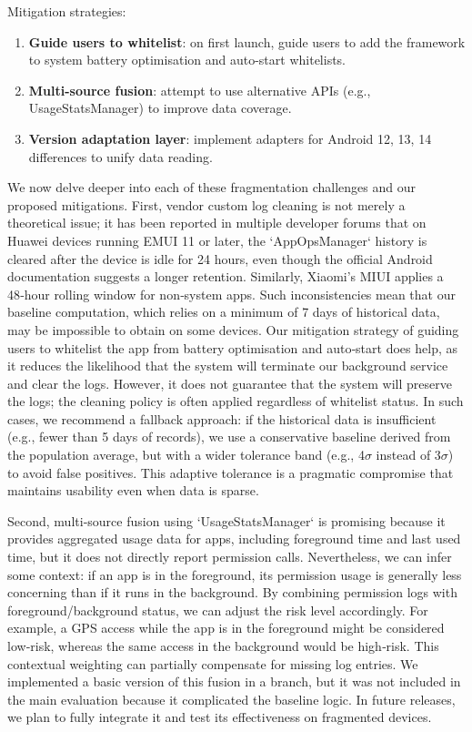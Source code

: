 Mitigation strategies:
\begin{enumerate}
\item \textbf{Guide users to whitelist}: on first launch, guide users to add the framework to system battery optimisation and auto-start whitelists.
\item \textbf{Multi-source fusion}: attempt to use alternative APIs (e.g., UsageStatsManager) to improve data coverage.
\item \textbf{Version adaptation layer}: implement adapters for Android 12, 13, 14 differences to unify data reading.
\end{enumerate}

We now delve deeper into each of these fragmentation challenges and our proposed mitigations. First, vendor custom log cleaning is not merely a theoretical issue; it has been reported in multiple developer forums that on Huawei devices running EMUI 11 or later, the `AppOpsManager` history is cleared after the device is idle for 24 hours, even though the official Android documentation suggests a longer retention. Similarly, Xiaomi's MIUI applies a 48‑hour rolling window for non‑system apps. Such inconsistencies mean that our baseline computation, which relies on a minimum of 7 days of historical data, may be impossible to obtain on some devices. Our mitigation strategy of guiding users to whitelist the app from battery optimisation and auto‑start does help, as it reduces the likelihood that the system will terminate our background service and clear the logs. However, it does not guarantee that the system will preserve the logs; the cleaning policy is often applied regardless of whitelist status. In such cases, we recommend a fallback approach: if the historical data is insufficient (e.g., fewer than 5 days of records), we use a conservative baseline derived from the population average, but with a wider tolerance band (e.g., 4$\sigma$ instead of 3$\sigma$) to avoid false positives. This adaptive tolerance is a pragmatic compromise that maintains usability even when data is sparse.

Second, multi‑source fusion using `UsageStatsManager` is promising because it provides aggregated usage data for apps, including foreground time and last used time, but it does not directly report permission calls. Nevertheless, we can infer some context: if an app is in the foreground, its permission usage is generally less concerning than if it runs in the background. By combining permission logs with foreground/background status, we can adjust the risk level accordingly. For example, a GPS access while the app is in the foreground might be considered low‑risk, whereas the same access in the background would be high‑risk. This contextual weighting can partially compensate for missing log entries. We implemented a basic version of this fusion in a branch, but it was not included in the main evaluation because it complicated the baseline logic. In future releases, we plan to fully integrate it and test its effectiveness on fragmented devices.

